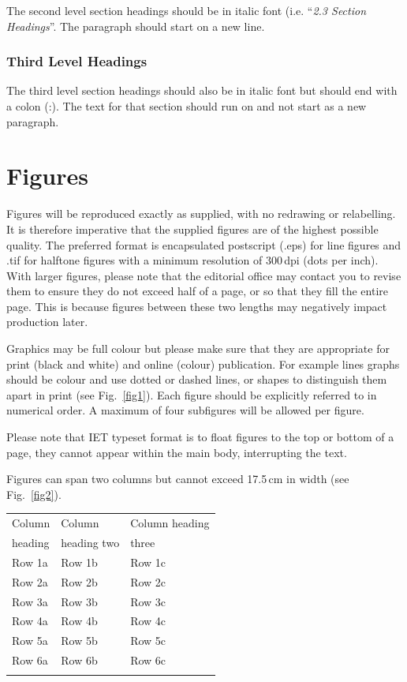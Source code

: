 \documentclass{cta-author}
\begin{document}
The second level section headings should be in italic font
(i.e. ``\textit{2.3 Section Headings}''. The paragraph
should start on a new line.

\subsubsection{Third Level Headings}\label{subsubsec5.3.3}

The third level section headings should also be in italic
font but should end with a colon (:). The text for that
section should run on and not start as a new paragraph.


\section{Figures}\label{sec6}

Figures will be reproduced exactly as supplied, with no
redrawing or relabelling. It is therefore imperative that
the supplied figures are of the highest possible quality.
The preferred format is encapsulated postscript (.eps) for
line figures and .tif for halftone figures with a minimum
resolution of 300\,dpi (dots per inch). With larger
figures, please note that the editorial office may contact
you to revise them to ensure they do not exceed half of a
page, or so that they fill the entire page. This is because
figures between these two lengths may negatively impact
production later.

Graphics may be full colour but please make sure that they
are appropriate for print (black and white) and online
(colour) publication. For example lines graphs should be
colour and use dotted or dashed lines, or shapes to
distinguish them apart in print (see Fig.~\ref{fig1}). Each
figure should be explicitly referred to in numerical order.
A maximum of four subfigures will be allowed per figure.

Please note that IET typeset format is to float figures to
the top or bottom of a page, they cannot appear within the
main body,  interrupting the text.

Figures can span two columns but cannot exceed 17.5\,cm in
width (see Fig.~\ref{fig2}).


\begin{table}[!b]
{\begin{tabular*}{20pc}{@{\extracolsep{\fill}}lll@{}}\toprule
Column  &Column  & Column heading \\
heading  &heading two &  three \\
\midrule
Row 1a  &Row 1b  &Row 1c \\
Row 2a  &Row 2b  &Row 2c \\
Row 3a  &Row 3b  & Row 3c \\
Row 4a  &Row 4b  &Row 4c \\
Row 5a  &Row 5b  &Row 5c \\
Row 6a  & Row 6b  & Row 6c \\
\botrule
\end{tabular*}}{}
\end{table}
\end{document}
